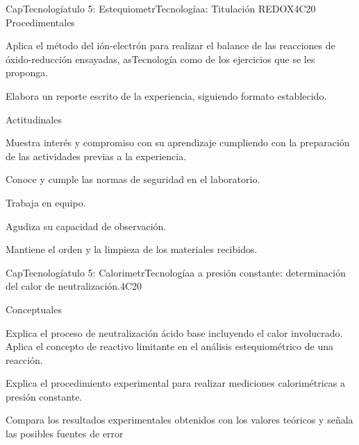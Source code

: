 \begin{syllabus}
\begin{unit}{CapTecnologíatulo 5:  EstequiometrTecnologíaa: Titulación REDOX}{}{}{4}{C20}
   Procedimentales

\begin{topics}
      \item Aplica el método del ión-electrón para realizar el balance de las reacciones de óxido-reducción ensayadas, asTecnología como de los ejercicios que se les proponga.
      \item Elabora un reporte escrito de la experiencia, siguiendo formato establecido.
   \end{topics}
   
   Actitudinales

\begin{topics}
      \item Muestra interés y compromiso con su aprendizaje cumpliendo con la preparación de las actividades previas a la experiencia.
      \item Conoce y cumple las normas de seguridad en el laboratorio.
      \item Trabaja en equipo.
      \item Agudiza su capacidad de observación.
     \item Mantiene el orden y la limpieza de los materiales recibidos.
   \end{topics}

   \begin{learningoutcomes}
      \item 
   \end{learningoutcomes}
   
\end{unit}

\begin{unit}{CapTecnologíatulo 5:  CalorimetrTecnologíaa a presión constante: determinación del calor de neutralización.}{}{}{4}{C20}

Conceptuales

\begin{topics}
      \item  Explica el proceso de neutralización ácido base incluyendo el calor involucrado.
   Aplica el concepto de reactivo limitante en el análisis estequiométrico de una reacción.
	\item Explica el procedimiento experimental para realizar mediciones calorimétricas a presión constante.
	\item Compara los resultados experimentales obtenidos con los valores teóricos y señala las posibles fuentes de error 
   \end{topics}
   

\end{unit}
\end{syllabus}
